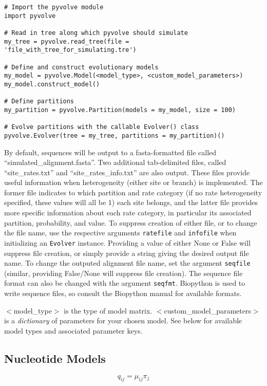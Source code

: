 \documentclass{article}
\begin{document}
\begin{lstlisting}
# Import the pyvolve module
import pyvolve

# Read in tree along which pyvolve should simulate
my_tree = pyvolve.read_tree(file = 'file_with_tree_for_simulating.tre')

# Define and construct evolutionary models
my_model = pyvolve.Model(<model_type>, <custom_model_parameters>)
my_model.construct_model()

# Define partitions
my_partition = pyvolve.Partition(models = my_model, size = 100)

# Evolve partitions with the callable Evolver() class
pyvolve.Evolver(tree = my_tree, partitions = my_partition)()
\end{lstlisting}

By default, sequences will be output to a fasta-formatted file called ``simulated\_alignment.fasta''. Two additional tab-delimited files, called ``site\_rates.txt'' and ``site\_rates\_info.txt'' are also output. These files provide useful information when heterogeneity (either site or branch) is implemented. The former file indicates to which partition and rate category (if no rate heterogeneity specified, these values will all be 1) each site belongs, and the latter file provides more specific information about each rate category, in particular its associated partition, probability, and value. To suppress creation of either file, or to change the file name, use the respective arguments \texttt{ratefile} and \texttt{infofile} when initializing an \texttt{Evolver} instance. Providing a value of either None or False will suppress file creation, or simply provide a string giving the desired output file name. To change the outputed alignment file name, set the argument \texttt{seqfile} (similar, providing False/None will suppress file creation). The sequence file format can also be changed with the argument \texttt{seqfmt}. Biopython is used to write sequence files, so consult the Biopython manual for available formats.

$<$model\_type$>$ is the type of model matrix. $<$custom\_model\_parameters$>$ is a \textit{dictionary} of parameters for your chosen model. See below for available model types and associated parameter keys.

\subsection{Nucleotide Models}

\begin{equation}
q_{ij} = \mu_{ij} \pi_j
\end{equation}
\end{document}
